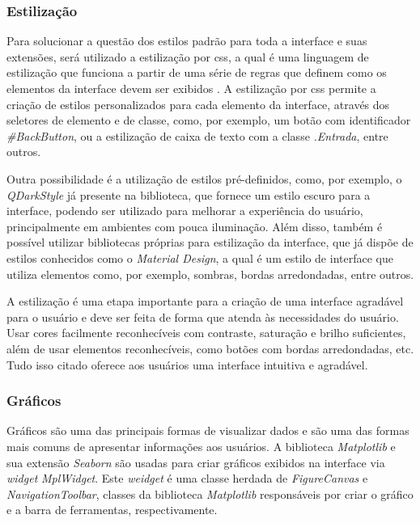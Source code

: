     \subsubsection{Estilização}

    Para solucionar a questão dos estilos padrão para toda a interface e suas extensões, será utilizado a estilização por \ac{css}, a qual é uma linguagem de estilização que funciona a partir de uma série de regras que definem como os elementos da interface devem ser exibidos \cite{css2022}. A estilização por \ac{css} permite a criação de estilos personalizados para cada elemento da interface, através dos seletores de elemento e de classe, como, por exemplo, um botão com identificador \textit{\#BackButton}, ou a estilização de caixa de texto com a classe \textit{.Entrada}, entre outros.

    Outra possibilidade é a utilização de estilos pré-definidos, como, por exemplo, o \textit{QDarkStyle} já presente na biblioteca, que fornece um estilo escuro para a interface, podendo ser utilizado para melhorar a experiência do usuário, principalmente em ambientes com pouca iluminação. Além disso, também é possível utilizar bibliotecas próprias para estilização da interface, que já dispõe de estilos conhecidos como o \textit{Material Design}, a qual é um estilo de interface que utiliza elementos como, por exemplo, sombras, bordas arredondadas, entre outros.

    A estilização é uma etapa importante para a criação de uma interface agradável para o usuário e deve ser feita de forma que atenda às necessidades do usuário. Usar cores facilmente reconhecíveis com contraste, saturação e brilho suficientes, além de usar elementos reconhecíveis, como botões com bordas arredondadas, etc. Tudo isso citado oferece aos usuários uma interface intuitiva e agradável.

    \subsubsection{Gráficos}

    Gráficos são uma das principais formas de visualizar dados e são uma das formas mais comuns de apresentar informações aos usuários. A biblioteca \textit{Matplotlib} e sua extensão \textit{Seaborn} são usadas para criar gráficos exibidos na interface via \textit{widget} \textit{MplWidget}. Este \textit{weidget} é uma classe herdada de \textit{FigureCanvas} e \textit{NavigationToolbar}, classes da biblioteca \textit{Matplotlib} responsáveis por criar o gráfico e a barra de ferramentas, respectivamente.

